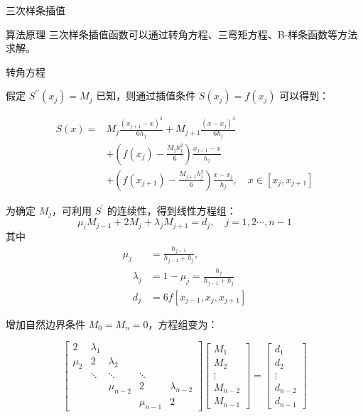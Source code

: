 \documentclass[a4paper]{article}
\begin{document}
\begin{multicols}{2}
\begin{section}{三次样条插值}
\begin{subsection}{算法原理}
		三次样条插值函数可以通过转角方程、三弯矩方程、B-样条函数等方法求解。
		
		\begin{subsubsection}{转角方程}
		
			假定 $S^{\prime \prime}(x_j) = M_j$ 已知，则通过插值条件 $S(x_j) = f(x_j)$ 可以得到：
			
			$$\begin{aligned} S(x)=& M_{j} \frac{\left(x_{j+1}-x\right)^{3}}{6 h_{j}}+M_{j+1} \frac{\left(x-x_{j}\right)^{3}}{6 h_{j}}\\&+\left(f\left(x_{j}\right)-\frac{M_{j} h_{j}^{2}}{6}\right) \frac{x_{j+1}-x}{h_{j}} \\ &+\left(f\left(x_{j+1}\right)-\frac{M_{j+1} h_{j}^{2}}{6}\right) \frac{x-x_{j}}{h_{j}}, \quad x \in\left[x_{j}, x_{j+1}\right] \end{aligned}$$
			
			为确定 $M_j$，可利用 $S^{\prime}$ 的连续性，得到线性方程组：$$\mu_{i} M_{j-1}+2 M_{j}+\lambda_{j} M_{j+1}=d_{j}, \quad j=1,2 \cdots, n-1$$ 其中 $$\begin{aligned} \mu_{j}&=\frac{h_{j-1}}{h_{j-1}+h_{j}}, \\ \quad \lambda_{j}&=1-\mu_{j}=\frac{h_{j}}{h_{j-1}+h_{j}} \\ \quad d_{j}&=6 f\left[x_{j-1}, x_{j}, x_{j+1}\right] \end{aligned}$$
			
			增加自然边界条件 $M_0 = M_n = 0$，方程组变为：
			
			\begin{tiny}
			$$\left[\begin{array}{ccccc}{2} & {\lambda_{1}} & {} & {} & {} \\ {\mu_{2}} & {2} & {\lambda_{2}} & {} & {} \\ {} & {\ddots} & {\ddots} & {\ddots} & {} \\ {} & {} & {\mu_{n-2}} & {2} & {\lambda_{n-2}} \\ {} & {} & {} & {\mu_{n-1}} & {2}\end{array}\right]\left[\begin{array}{c}{M_{1}} \\ {M_{2}} \\ {\vdots} \\ {M_{n-2}} \\ {M_{n-1}}\end{array}\right]=\left[\begin{array}{c}{d_{1}} \\ {d_{2}} \\ {\vdots} \\ {d_{n-2}} \\ {d_{n-1}}\end{array}\right]$$
			\end{tiny}
			

\end{subsubsection}
\end{subsection}
\end{section}
\end{multicols}
\end{document}
